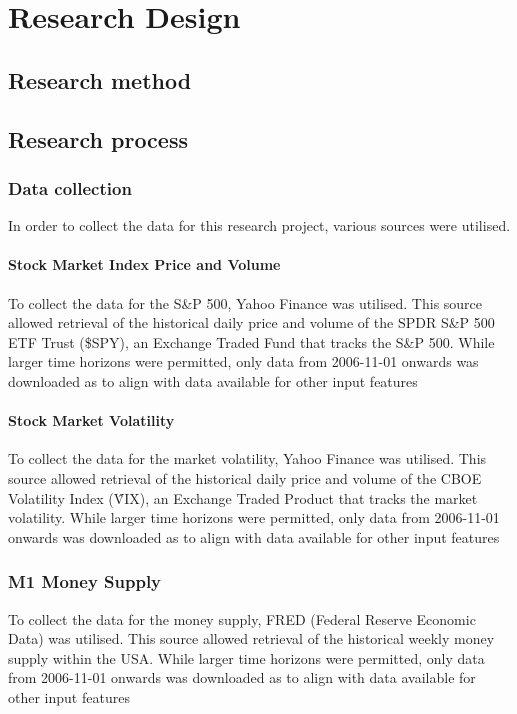 \chapter{Research Design} \label{chap:research-design}
\section{Research method}
\section{Research process}
\subsection{Data collection}
In order to collect the data for this research project, various sources were utilised.

\subsubsection{Stock Market Index Price and Volume}
To collect the data for the S\&P 500, Yahoo Finance was utilised. This source allowed
retrieval of the historical daily price and volume of the SPDR S\&P 500 ETF Trust (\$SPY),
an Exchange Traded Fund that tracks the S\&P 500. While larger time horizons were permitted,
only data from 2006-11-01 onwards was downloaded as to align with data available for other
input features

\subsubsection{Stock Market Volatility}
To collect the data for the market volatility, Yahoo Finance was utilised. This source allowed
retrieval of the historical daily price and volume of the CBOE Volatility Index (\^VIX),
an Exchange Traded Product that tracks the market volatility. While larger time horizons were
permitted, only data from 2006-11-01 onwards was downloaded as to align with data available for
other input features

\subsection{M1 Money Supply}

To collect the data for the money supply, FRED (Federal Reserve Economic Data) was utilised. This source allowed
retrieval of the historical weekly money supply within the USA. While larger time horizons were
permitted, only data from 2006-11-01 onwards was downloaded as to align with data available for
other input features

